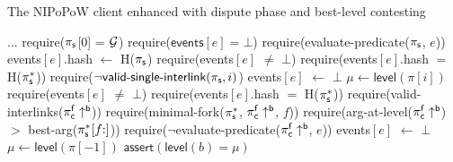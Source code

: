 \begin{algorithm}
    \caption{\label{alg:dispute-best-level}The \textsf{NIPoPoW} client enhanced
        with dispute phase and best-level contesting}

    \begin{algorithmic}[1]

    \State ...
        \State \textsf{require}($\mathsf{\pi_{s}}$[0] = $\mathcal{G}$)
        \State \textsf{require}($\textsf{events$[e]$} = \bot$)
        \State \textsf{require}(\textsf{evaluate-predicate}(\textsf{$\mathsf{\pi_{s}}$}, $e$))
        \State \textsf{events$[e]$.hash} $\gets$ \textsf{H}($\mathsf{\pi_{s}}$)
    \EndFunction
    \label{alg:dispute-best-level:dispute-start}
        \State \textsf{require}(\textsf{events}$[e]$ $\ne$ $\bot$)
        \State \textsf{require}(\textsf{events$[e]$.hash} $=$ \textsf{H}($\mathsf{\pi_{s}^*}$))
        \State \textsf{require}($\neg \textsf{valid-single-interlink}(\mathsf{\pi_{s}}, i)$)
        \State \textsf{events$[e]$} $\gets$ $\bot$
    \EndFunction\label{alg:dispute-best-level:dispute-end}
        \State $\mu\gets\textsf{level}(\pi[i])$
        \State{}
    \EndFunction
        \State \textsf{require}(\textsf{events}$[e]$ $\ne$ $\bot$)
        \State \textsf{require}(\textsf{events$[e]$.hash} $=$ \textsf{H}($\mathsf{\pi_{s}^*}$))
        \State \textsf{require}(\textsf{valid-interlinks}($\mathsf{\pi_{c}^f\uparrow^{b}}$))
        \State \textsf{require}(\textsf{minimal-fork}($\mathsf{\pi_{s}^*}$,
        $\mathsf{\pi_{c}^f\uparrow^{b}}$, $f$))
        \State \textsf{require}(\textsf{arg-at-level}($\mathsf{\pi_{c}^f\uparrow^{b}}$)
        $>$ \textsf{best-arg}($\mathsf{\pi_{s}^*}[f{:}]$))
        \State \textsf{require}(\textsf{$\neg$evaluate-predicate}($\mathsf{\pi_{c}^f\uparrow^{b}}$, $e$))
        \State \textsf{events$[e]$} $\gets$ $\bot$
    \EndFunction
        \State $\mu \gets \textsf{level}(\pi[-1])$
            \State$\textsf{assert}(\textsf{level}(b) = \mu)$
        \EndFor
        \State {}
    \EndFunction
    \EndContract
    \vskip8pt
    \end{algorithmic}
\end{algorithm}

